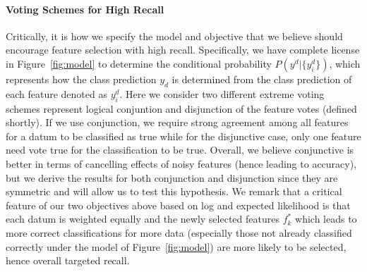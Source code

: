 
\paragraph{Voting Schemes for High Recall}

Critically, it is how we specify the model and objective that we
believe should encourage feature selection with high recall.
Specifically, we have complete license in Figure~\ref{fig:model} to
determine the conditional probability $P(y^d|\{y^d_i\})$, which
represents how the class prediction $y_d$ is determined from the class
prediction of each feature denoted as $y^d_i$.  Here we consider two
different extreme voting schemes represent logical conjuntion and
disjunction of the feature votes (defined shortly).  If we use
conjunction, we require strong agreement among all features for a
datum to be classified as true while for the disjunctive case, only
one feature need vote true for the classification to be true.
Overall, we believe conjunctive is better in terms of cancelling
effects of noisy features (hence leading to accuracy), but we derive
the results for both conjunction and disjunction since they are
symmetric and will allow us to test this hypothesis.  We remark that a
critical feature of our two objectives above based on log and expected
likelihood is that each datum is weighted equally and the newly
selected features $f_k^*$ which leads to more correct classifications
for more data (especially those not already classified correctly under
the model of Figure~\ref{fig:model}) are more likely to be selected,
hence overall targeted recall.

